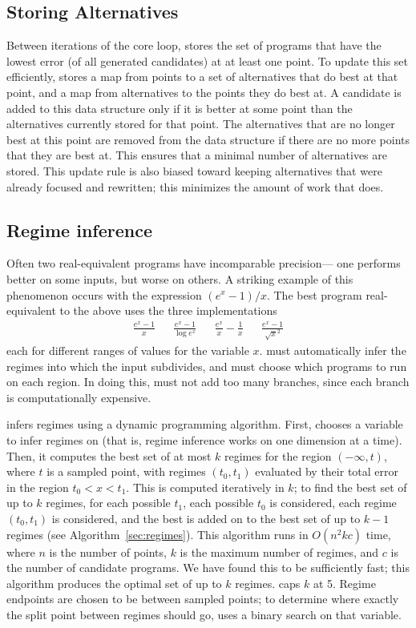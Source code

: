 \documentclass[paper.tex]{subfiles}
\begin{document}
\subsection{Storing Alternatives}

Between iterations of the core loop,
  \casio stores the set of programs
  that have the lowest error (of all generated candidates)
  at at least one point.
To update this set efficiently, \casio stores
  a map from points to a set of alternatives that do best at that point,
  and a map from alternatives to the points they do best at.
A candidate is added to this data structure
  only if it is better at some point
  than the alternatives currently stored for that point.
The alternatives that are no longer best at this point
  are removed from the data structure
  if there are no more points that they are best at.
This ensures that a minimal number of alternatives are stored.
This update rule is also biased toward keeping alternatives
  that were already focused and rewritten;
  this minimizes the amount of work that \casio does.

\subsection{Regime inference}

Often two real-equivalent programs have incomparable precision---%
  one performs better on some inputs, but worse on others.
A striking example of this phenomenon occurs with the expression $(e^x - 1) / x$.
The best program real-equivalent to the above
  uses the three implementations
\begin{align*}
  \frac{e^x - 1}{x} && \frac{e^x - 1}{\log e^x} &&
  \frac{e^x}{x} - \frac1x && \frac{e^x - 1}{\sqrt{x}^2} 
\end{align*}
  each for different ranges of values for the variable $x$.
\casio must automatically infer the regimes
  into which the input subdivides,
  and must choose which programs to run on each region.
In doing this, \casio must not add too many branches,
  since each branch is computationally expensive.

\casio infers regimes using a dynamic programming algorithm.
First, \casio chooses a variable to infer regimes on
  (that is, regime inference works on one dimension at a time).
Then, it computes the best set of at most $k$ regimes
  for the region $(-\infty, t)$, where $t$ is a sampled point,
  with regimes $(t_0, t_1)$ evaluated by their total error
  in the region $t_0 < x < t_1$.
This is computed iteratively in $k$;
  to find the best set of up to $k$ regimes,
  for each possible $t_1$, each possible $t_0$ is considered,
  each regime $(t_0, t_1)$ is considered,
  and the best is added on to the best set of up to $k-1$ regimes
  (see Algorithm~\ref{sec:regimes}).
This algorithm runs in $O(n^2 k c)$ time,
  where $n$ is the number of points,
  $k$ is the maximum number of regimes,
  and $c$ is the number of candidate programs.
We have found this to be sufficiently fast;
  this algorithm produces the optimal set of up to $k$ regimes.
\casio caps $k$ at 5.
Regime endpoints are chosen to be between sampled points;
  to determine where exactly the split point between regimes should go,
  \casio uses a binary search on that variable.
\end{document}
